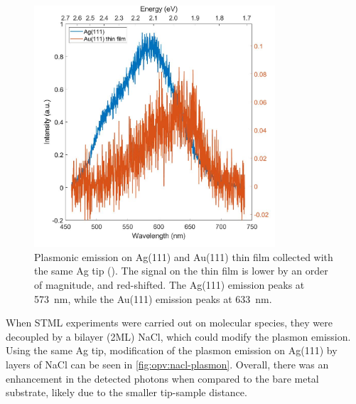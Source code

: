 
\begin{figure} [h]
    \centering
    \includegraphics[width=0.8\textwidth]{pictures/Ag_Au_plasmon_3V_200pA_10s.jpg}
    \caption{Plasmonic emission on Ag(111) and Au(111) thin film collected with the same Ag tip (). The signal on the thin film is lower by an order of magnitude, and red-shifted. The Ag(111) emission peaks at \SI{573}{nm}, while the Au(111) emission peaks at \SI{633}{nm}.}
    \label{fig:opv:metal-plasmon}
\end{figure}



When \ac{STML} experiments were carried out on molecular species, they were decoupled by a bilayer (2\ac{ML}) NaCl, which could modify the plasmon emission. Using the same Ag tip, modification of the plasmon emission on Ag(111) by layers of NaCl can be seen in \autoref{fig:opv:nacl-plasmon}. Overall, there was an enhancement in the detected photons when compared to the bare metal substrate, likely due to the smaller tip-sample distance.


